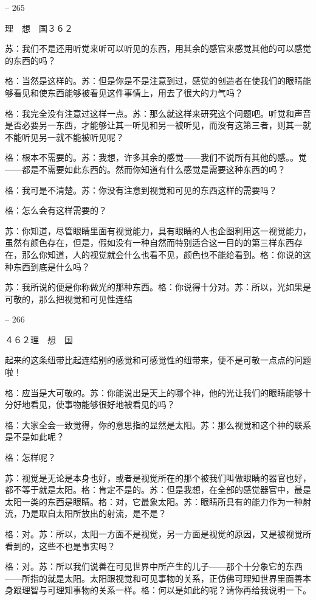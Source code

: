 \documentclass[11pt,oneside]{book}
\begin{document}
\begin{common-format}
-- 265

    理　想　国３６２

    苏：我们不是还用听觉来听可以听见的东西，用其余的感官来感觉其他的可以感觉的东西的吗？

    格：当然是这样的。苏：但是你是不是注意到过，感觉的创造者在使我们的眼睛能够看见和使东西能够被看见这件事情上，用去了很大的力气吗？

    格：我完全没有注意过这样一点。苏：那么就这样来研究这个问题吧。听觉和声音是否必要另一东西，才能够让其一听见和另一被听见，而没有这第三者，则其一就不能听见另一就不能被听见呢？

    格：根本不需要的。苏：我想，许多其余的感觉——我们不说所有其他的感。。觉——都是不需要如此东西的。然而你知道有什么感觉是需要这种东西的吗？

    格：我可是不清楚。苏：你没有注意到视觉和可见的东西这样的需要吗？

    格：怎么会有这样需要的？

    苏：你知道，尽管眼睛里面有视觉能力，具有眼睛的人也企图利用这一视觉能力，虽然有颜色存在，但是，假如没有一种自然而特别适合这一目的的第三样东西存在，那么你知道，人的视觉就会什么也看不见，颜色也不能给看到。格：你说的这种东西到底是什么吗？

    苏：我所说的便是你称做光的那种东西。格：你说得十分对。苏：所以，光如果是可敬的，那么把视觉和可见性连结

    

-- 266

    ４６２理　想　国

    起来的这条纽带比起连结别的感觉和可感觉性的纽带来，便不是可敬一点点的问题啦！

    格：应当是大可敬的。苏：你能说出是天上的哪个神，他的光让我们的眼睛能够十分好地看见，使事物能够很好地被看见的吗？

    格：大家全会一致觉得，你的意思指的显然是太阳。苏：那么视觉和这个神的联系是不是如此呢？

    格：怎样呢？

    苏：视觉是无论是本身也好，或者是视觉所在的那个被我们叫做眼睛的器官也好，都不等于就是太阳。格：肯定不是的。苏：但是我想，在全部的感觉器官中，最是太阳一类的东西是眼睛。格：对，它最象太阳。苏：眼睛所具有的能力作为一种射流，乃是取自太阳所放出的射流，是不是？

    格：对。苏：所以，太阳一方面不是视觉，另一方面是视觉的原因，又是被视觉所看到的，这些不也是事实吗？

    格：对。苏：所以我们说善在可见世界中所产生的儿子——那个十分象它的东西——所指的就是太阳。太阳跟视觉和可见事物的关系，正仿佛可理知世界里面善本身跟理智与可理知事物的关系一样。格：何以是如此的呢？请你再给我说明一下。


\end{common-format}
\end{document}
